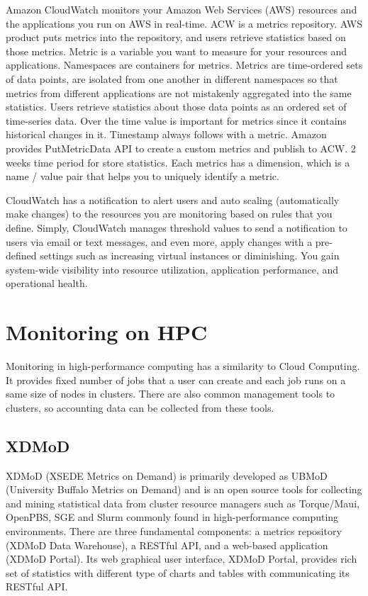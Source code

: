 \documentclass{sig-alternate}
\begin{document}
Amazon CloudWatch monitors your Amazon Web Services (AWS) resources and the applications you run on AWS in real-time. ACW is a metrics repository. AWS product puts metrics into the repository, and users retrieve statistics based on those metrics. Metric is a variable you want to measure for your resources and applications. Namespaces are containers for metrics. Metrics are time-ordered sets of data points, are isolated from one another in different namespaces so that metrics from different applications are not mistakenly aggregated into the same statistics. Users retrieve statistics about those data points as an ordered set of time-series data. Over the time value is important for metrics since it contains historical changes in it. Timestamp always follows with a metric. Amazon provides PutMetricData API to create a custom metrics and publish to ACW. 2 weeks time period for store statistics. Each metrics has a dimension, which is a name / value pair that helps you to uniquely identify a metric.

CloudWatch has a notification to alert users and auto scaling (automatically make changes) to the resources you are monitoring based on rules that you define. Simply, CloudWatch manages threshold values to send a notification to users via email or text messages, and even more, apply changes with a pre-defined settings such as increasing virtual instances or diminishing. You gain system-wide visibility into resource utilization, application performance, and operational health.

\section{Monitoring on HPC}

Monitoring in high-performance computing has a similarity to Cloud Computing. It provides fixed number of jobs that a user can create and each job runs on a same size of nodes in clusters. There are also common management tools to clusters, so accounting data can be collected from these tools.

\subsection{XDMoD}

XDMoD (XSEDE Metrics on Demand) is primarily developed as UBMoD (University Buffalo Metrics on Demand) and is an open source tools for collecting and mining statistical data from cluster resource managers such as Torque/Maui, OpenPBS, SGE and Slurm commonly found in high-performance computing environments. There are three fundamental components: a metrics repository (XDMoD Data Warehouse), a RESTful API, and a web-based application (XDMoD Portal). Its web graphical user interface, XDMoD Portal, provides rich set of statistics with different type of charts and tables with communicating its RESTful API. ~\cite{CPE:CPE2871,Furlani:2013:UXF:2484762.2484763}
\end{document}
